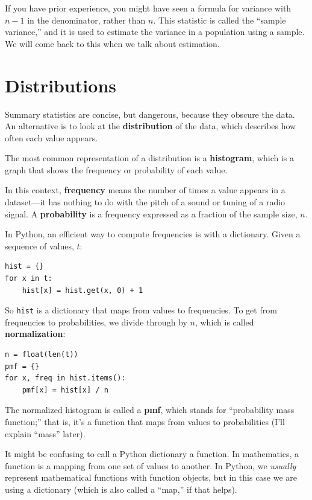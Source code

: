 \documentclass[12pt]{book}
\begin{document}
If you have prior experience, you might have seen a 
formula for variance with $n-1$ in the denominator, rather than $n$.
This statistic is called the ``sample variance,'' and it is used
to estimate the variance in a population using a sample.  We will
come back to this when we talk about estimation.

\section{Distributions}
\label{distributions}

Summary statistics are concise, but dangerous, because they obscure
the data.  An alternative is to look at the {\bf distribution} of the
data, which describes how often each value appears.

The most common representation of a distribution is a {\bf histogram},
which is a graph that shows the frequency or probability
of each value.  

In this context, {\bf frequency} means the number of times a value
appears in a dataset---it has nothing to do with the pitch of a sound
or tuning of a radio signal.  A {\bf probability} is a frequency expressed
as a fraction of the sample size, $n$.

In Python, an efficient way to compute frequencies is with a dictionary.
Given a sequence of values, $t$:

\begin{verbatim}
hist = {}
for x in t:
    hist[x] = hist.get(x, 0) + 1
\end{verbatim}

So {\tt hist} is a dictionary that maps from values to frequencies.
To get from frequencies to probabilities, we divide through by $n$,
which is called {\bf normalization}:

\begin{verbatim}
n = float(len(t))
pmf = {}
for x, freq in hist.items():
    pmf[x] = hist[x] / n
\end{verbatim}

The normalized histogram is called a {\bf pmf}, which stands for
``probability mass function;''  that is, it's a function that
maps from values to probabilities (I'll explain ``mass'' later).

It might be confusing to call a Python dictionary a function.  In
mathematics, a function is a mapping from one set of values to
another.  In Python, we {\em usually} represent mathematical functions
with function objects, but in this case we are using a dictionary
(which is also called a ``map,'' if that helps).
\end{document}
